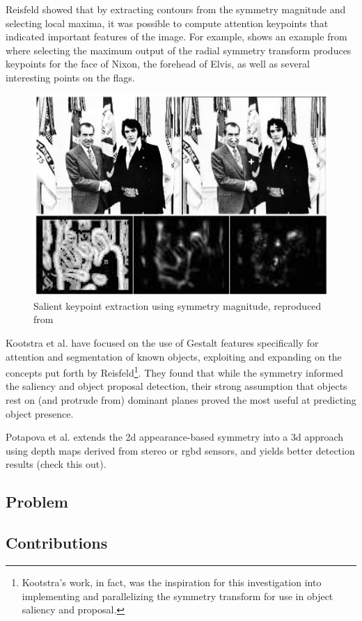 Reisfeld showed that by extracting contours from the symmetry magnitude and selecting local maxima, it was possible to compute attention keypoints that indicated important features of the image. For example,  shows an example from \cite{reisfeld_context_1995} where selecting the maximum output of the radial symmetry transform produces keypoints for the face of Nixon, the forehead of Elvis, as well as several interesting points on the flags.

\begin{figure}[htbp]
\centering
\includegraphics[width=0.5\linewidth]{Introduction/elvis.png}
\caption{\label{fig:salient}
Salient keypoint extraction using symmetry magnitude, reproduced from }
\end{figure}

Kootstra et al. have focused on the use of Gestalt features specifically for attention and segmentation of known objects\cite{kootstra_using_2010,kootstra_gestalt_2011}, exploiting and expanding on the concepts put forth by Reisfeld\footnote{Kootstra's work, in fact, was the inspiration for this investigation into implementing and parallelizing the symmetry transform for use in object saliency and proposal.}. They found that while the symmetry informed the saliency and object proposal detection, their strong assumption that objects rest on (and protrude from) dominant planes proved the most useful at predicting object presence. 

Potapova et al.\cite{potapova_local_2012} extends the \gls{2d} appearance-based symmetry into a \gls{3d} approach using depth maps derived from stereo or \gls{rgbd} sensors, and yields better detection results (check this out).

\subsection{Problem}
\label{sec:problem}

\subsection{Contributions}
\label{sec:contributions}

